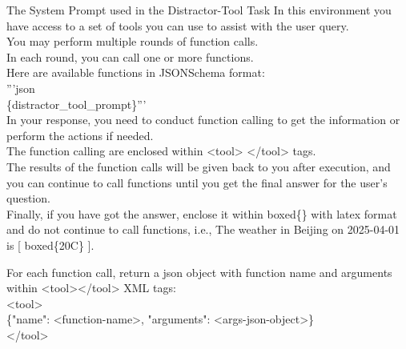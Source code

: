 \documentclass[11pt]{article}
\begin{document}
\begin{promptbox}{The System Prompt used in the Distractor-Tool Task}
In this environment you have access to a set of tools you can use to assist with the user query. \\
    You may perform multiple rounds of function calls. \\
    In each round, you can call one or more functions. \\
    Here are available functions in JSONSchema format: \\'''json\\\{distractor\_tool\_prompt\}'''\\
    In your response,  you need to conduct function calling to get the information or perform the actions if needed. \\
    The function calling are enclosed within <tool> </tool> tags. \\
    The results of the function calls will be given back to you after execution,
    and you can continue to call functions until you get the final answer for the user's question. \\
    Finally, if you have got the answer, enclose it within boxed\{\} with latex format and do not continue to call functions, 
    i.e., The weather in Beijing on 2025-04-01 is [ boxed\{20C\} ].

    For each function call, return a json object with function name and arguments within <tool></tool> XML tags:\\
    <tool>\\
    \{"name": <function-name>, "arguments": <args-json-object>\}\\
    </tool>
\end{promptbox}
\end{document}
